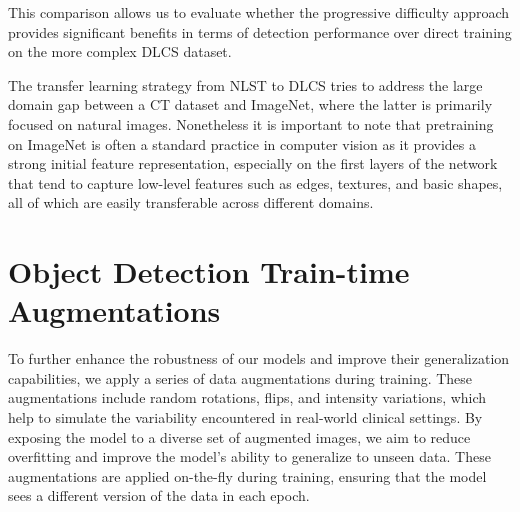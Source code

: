 This comparison allows us to evaluate whether the progressive difficulty approach provides significant benefits in terms of detection performance over direct training on the more complex DLCS dataset. 

The transfer learning strategy from NLST to DLCS tries to address the large domain gap between a CT dataset and ImageNet, where the latter is primarily focused on natural images. Nonetheless it is important to note that pretraining on ImageNet is often a standard practice in computer vision as it provides a strong initial feature representation, especially on the first layers of the network that tend to capture low-level features such as edges, textures, and basic shapes, all of which are easily transferable across different domains.


\section{Object Detection Train-time Augmentations}
\label{sec:augmentation}
To further enhance the robustness of our models and improve their generalization capabilities, we apply a series of data augmentations during training. These augmentations include random rotations, flips, and intensity variations, which help to simulate the variability encountered in real-world clinical settings. By exposing the model to a diverse set of augmented images, we aim to reduce overfitting and improve the model's ability to generalize to unseen data. These augmentations are applied on-the-fly during training, ensuring that the model sees a different version of the data in each epoch.

